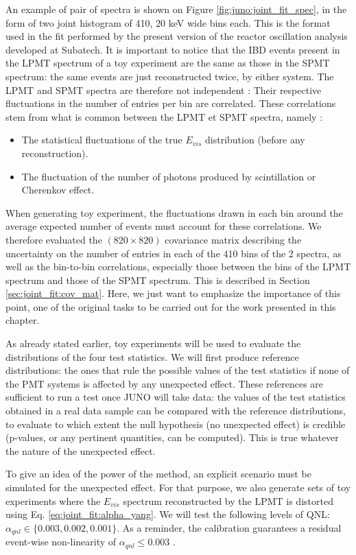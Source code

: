 \documentclass[../main.tex]{subfiles}
\begin{document}
An example of pair of spectra is shown on Figure \ref{fig:juno:joint_fit_spec}, in the form of two joint histogram of 410, 20 keV wide bins each. This is the format used in the fit performed by the present version of the reactor oscillation analysis developed at Subatech. It is important to notice that the IBD events present in the LPMT spectrum of a toy experiment are the same as those in the SPMT spectrum: the same events are just reconstructed twice, by either system. The LPMT and SPMT spectra are therefore not independent : Their respective fluctuations in the number of entries per bin are correlated. These correlations stem from what is common between the LPMT et SPMT spectra, namely :

\begin{itemize}
  \item The statistical fluctuations of the true $E_{vis}$ distribution (before any reconstruction).
  \item The fluctuation of the number of photons produced by scintillation or Cherenkov effect.
\end{itemize}
\hfill

When generating toy experiment, the fluctuations drawn in each bin around the average expected number of events must account for these correlations. We therefore evaluated the $(820 \times 820)$ covariance matrix describing the uncertainty on the number of entries in each of the 410 bins of the 2 spectra, as well as the bin-to-bin correlations, especially those between the bins of the LPMT spectrum and those of the SPMT spectrum. This is described in Section \ref{sec:joint_fit:cov_mat}. Here, we just want to emphasize the importance of this point, one of the original tasks to be carried out for the work presented in this chapter.

As already stated earlier, toy experiments will be used to evaluate the distributions of the four test statistics. We will first produce reference distributions: the ones that rule the possible values of the test statistics if none of the PMT systems is affected by any unexpected effect. These references are sufficient to run a test once JUNO will take data: the values of the test statistics  obtained in a real data sample can be compared with the reference distributions, to evaluate to which extent the null hypothesis (no unexpected effect) is credible (p-values, or any pertinent quantities, can be computed). This is true whatever the nature of the unexpected effect.

To give an idea of the power of the method, an explicit scenario must be simulated for the unexpected effect. For that purpose, we also generate sets of toy experiments where the $E_{vis}$ spectrum reconstructed by the LPMT is distorted using Eq. \ref{eq:joint_fit:alpha_yang}. We will test the following levels of QNL: $\alpha_{qnl} \in \{0.003, 0.002, 0.001\}$. As a reminder, the calibration guarantees a residual event-wise non-linearity of $\alpha_{qnl} \leq 0.003$ \cite{juno_collaboration_calibration_2021}.
\end{document}
